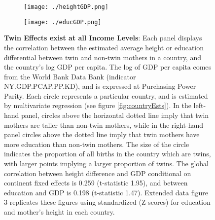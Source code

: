 \documentclass{nature}
\begin{document}
\begin{linenumbers}
\begin{spacing}{1}
\begin{figure}[htpb!]
\begin{subfigure}{.5\textwidth}
  \texttt{[image: ./heightGDP.png]}
\end{subfigure}%
\begin{subfigure}{.5\textwidth}
  \texttt{[image: ./educGDP.png]}
\end{subfigure}
\vspace{5mm}
\caption{\textbf{Twin Effects exist at all Income Levels}: {\footnotesize Each panel displays the correlation between the estimated average height or education differential between twin and non-twin mothers in a country, and the country's log GDP per capita. The log of GDP per capita comes from the World Bank Data Bank (indicator NY.GDP.PCAP.PP.KD), and is expressed at Purchasing Power Parity.  Each circle represents a particular country, and is estimated by multivariate regression (see figure \ref{fig:countryEsts}).  In the left-hand panel, circles above the horizontal dotted line imply that twin mothers are taller than non-twin mothers, while in the right-hand panel circles above the dotted line imply that twin mothers have more education than non-twin mothers. The size of the circle indicates the proportion of all births in the country which are twins, with larger points implying a larger proportion of twins. The global correlation between height difference and GDP conditional on continent fixed effects is 0.259 (t-statistic 1.95), and between education and GDP is 0.198 (t-statistic 1.47). Extended data figure 3 replicates these figures using standardized (Z-scores) for education and mother's height in each country.}}
\label{fig:GDPEsts}
\end{figure}




\end{spacing}
\end{linenumbers}
\end{document}
